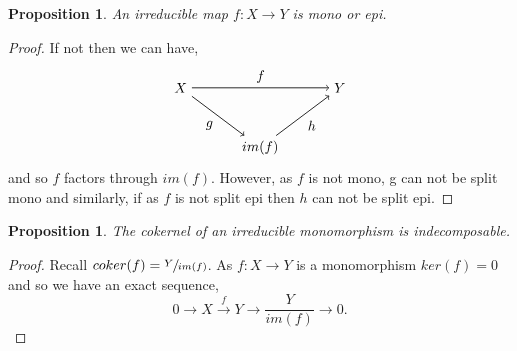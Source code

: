 \documentclass[11.5pt, twoside, a4paper, titlepage]{report}
\theoremstyle{definition}
\theoremstyle{plain}
\newtheorem{prop}[mydef]{Proposition}
\begin{document}
\begin{prop}
An irreducible map $f: X \to Y$ is mono or epi.
\end{prop}
\begin{proof}
If not then we can have,
\begin{equation*}
\begin{tikzpicture}[->,-latex, auto, main path/.style={->, semithick}, main node/.style={}]
\node	[main node]		(1) at (0,0)		{$X$};
\node [main node]		(2) at (4,0)		{$Y$};
\node [main node]		(3) at (2,-1.5)	{$im(f)$};

\draw (1) [main path] edge node [auto] {$f$} (2);
\draw (1) [main path] edge node [auto, swap] {$g$} (3);
\draw (3) [main path] edge node [auto, swap] {$h$} (2);
\end{tikzpicture}
\end{equation*}
and so $f$ factors through $im(f)$. However, as $f$ is not mono, g can not be split mono and similarly, if as $f$ is not split epi then $h$ can not be split epi.
\end{proof}

\begin{prop}
The cokernel of an irreducible monomorphism is indecomposable.
\end{prop}
\begin{proof}
Recall $coker(f)=\sfrac{Y}{im(f)}$. As $f: X \to Y$ is a monomorphism $ker(f)=0$ and so we have an exact sequence, 
\begin{equation*}
0 \xrightarrow{} X \xrightarrow{f} Y \xrightarrow{} \frac{Y}{im(f)} \xrightarrow{} 0.
\end{equation*}
\end{proof}
\end{document}
